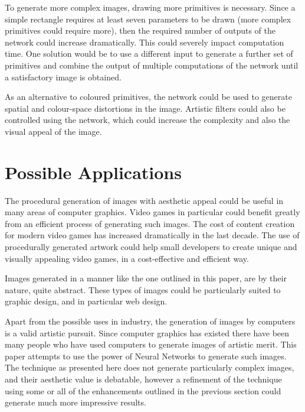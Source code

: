 \documentclass{acm_proc_article-sp}
\begin{document}
\vspace{3mm}

To generate more complex images, drawing more primitives is necessary. Since a simple rectangle requires at least seven parameters to be drawn (more complex primitives could require more), then the required number of outputs of the network could increase dramatically. This could severely impact computation time. One solution would be to use a different input to generate a further set of primitives and combine the output of multiple computations of the network until a satisfactory image is obtained. 

\vspace{3mm}

As an alternative to coloured primitives, the network could be used to generate spatial and colour-space distortions in the image. Artistic filters could also be controlled using the network, which could increase the complexity and also the visual appeal of the image.

\section{Possible Applications}
\label{sec:appl}

The procedural generation of images with aesthetic appeal could be useful in many areas of computer graphics. Video games in particular could benefit greatly from an efficient process of generating such images. The cost of content creation for modern video games has increased dramatically in the last decade. The use of procedurally generated artwork could help small developers to create unique and visually appealing video games, in a cost-effective and efficient way. 

\vspace{3mm}

Images generated in a manner like the one outlined in this paper, are by their nature, quite abstract. These types of images could be particularly suited to graphic design, and in particular web design. 

\vspace{3mm}

Apart from the possible uses in industry, the generation of images by computers is a valid artistic pursuit. Since computer graphics has existed there have been many people who have used computers to generate images of artistic merit. This paper attempts to use the power of Neural Networks to generate such images. The technique as presented here does not generate particularly complex images, and their aesthetic value is debatable, however a refinement of the technique using some or all of the enhancements outlined in the previous section could generate much more impressive results.



\end{document}
